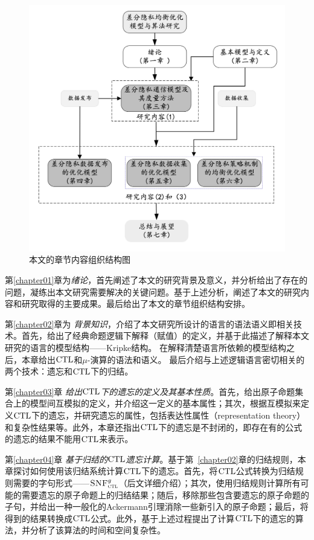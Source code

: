 \begin{figure}[htbp]
	\centering
	\includegraphics[width = 0.7\linewidth]{./figures/chapter01_2.jpg}
	\caption{本文的章节内容组织结构图}
	\label{fig:chapter1-research-structure}
\end{figure}

第\ref{chapter01}章为\textit{绪论}，首先阐述了本文的研究背景及意义，并分析给出了存在的问题，凝练出本文研究需要解决的关键问题。基于上述分析，阐述了本文的研究内容和研究取得的主要成果。最后给出了本文的章节组织结构安排。


第\ref{chapter02}章为 {\em 背景知识}，介绍了本文研究所设计的语言的语法语义即相关技术。首先，给出了经典命题逻辑下解释（赋值）的定义，并基于此描述了解释本文研究的语言的模型结构——Kripke结构。
在解释清楚语言所依赖的模型结构之后，本章给出$\textrm{CTL}$和$\mu$-演算的语法和语义。
最后介绍与上述逻辑语言密切相关的两个技术：遗忘和$\textrm{CTL}$下的归结。



第\ref{chapter03}章 {\em 给出$\textrm{CTL}$下的遗忘的定义及其基本性质}。首先，给出原子命题集合上的模型间互模拟的定义，并介绍这一定义的基本属性；其次，根据互模拟来定义$\textrm{CTL}$下的遗忘，并研究遗忘的属性，包括表达性属性（representation theory）和复杂性结果等。此外，本章还指出$\textrm{CTL}$下的遗忘是不封闭的，即存在有的公式的遗忘的结果不能用$\textrm{CTL}$来表示。



第\ref{chapter04}章 {\em 基于归结的$\textrm{CTL}$遗忘计算}。基于第~\ref{chapter02}章的归结规则，本章探讨如何使用该归结系统计算$\textrm{CTL}$下的遗忘。首先，将$\textrm{CTL}$公式转换为归结规则需要的字句形式——${\textsc{SNF}_{\textsc{ctl}}^g}$（后文详细介绍）；其次，使用归结规则计算所有可能的需要遗忘的原子命题上的归结结果；随后，移除那些包含要遗忘的原子命题的子句，并给出一种一般化的Ackermann引理消除一些新引入的原子命题；最后，将得到的结果转换成$\textrm{CTL}$公式。此外，基于上述过程提出了计算$\textrm{CTL}$下的遗忘的算法，并分析了该算法的时间和空间复杂性。

